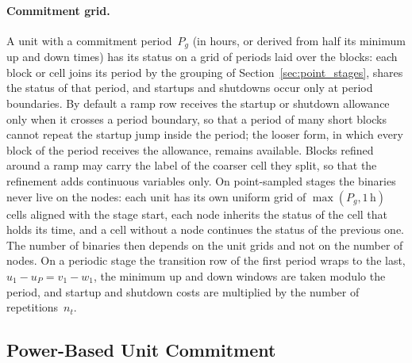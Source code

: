 \paragraph{Commitment grid.}
A unit with a commitment period~$P_g$ (in hours, or derived from half
its minimum up and down times) has its status on a grid of periods laid
over the blocks: each block or cell joins its period by the grouping of
Section~\ref{sec:point_stages}, shares the status of that period, and
startups and shutdowns occur only at period boundaries.  By default a
ramp row receives the startup or shutdown allowance only when it
crosses a period boundary, so that a period of many short blocks cannot
repeat the startup jump inside the period; the looser form, in which
every block of the period receives the allowance, remains available.
Blocks refined around a ramp may carry the label of the coarser cell
they split, so that the refinement adds continuous variables only.  On
point-sampled stages the binaries never live on the nodes: each unit
has its own uniform grid of $\max(P_g, 1\,\text{h})$ cells aligned with
the stage start, each node inherits the status of the cell that holds
its time, and a cell without a node continues the status of the
previous one.  The number of binaries then depends on the unit grids and
not on the number of nodes.  On a periodic stage the transition row of
the first period wraps to the last, $u_1 - u_P = v_1 - w_1$, the
minimum up and down windows are taken modulo the period, and startup
and shutdown costs are multiplied by the number of repetitions~$n_t$.

\subsection{Power-Based Unit Commitment}
\label{sec:pbuc}

